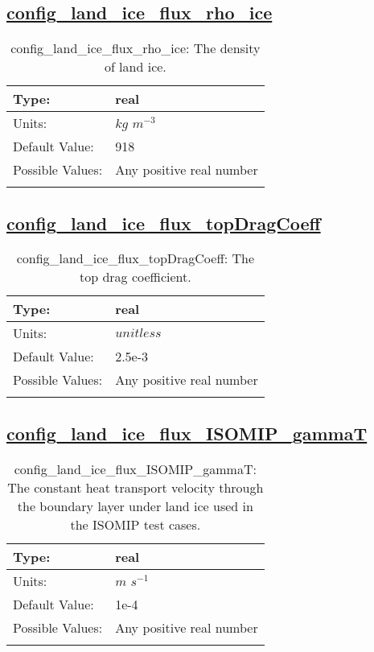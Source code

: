 \subsection[config\_land\_ice\_flux\_rho\_ice]{\hyperref[sec:nm_tab_land_ice_fluxes]{config\_land\_ice\_flux\_rho\_ice}}
\label{subsec:nm_sec_config_land_ice_flux_rho_ice}
\begin{center}
\begin{longtable}{| p{2.0in} || p{4.0in} |}
    \hline
    Type: & real \\
    \hline
    Units: & $kg$ $m^{-3}$ \\
    \hline
    Default Value: & 918 \\
    \hline
    Possible Values: & Any positive real number \\
    \hline
    \caption{config\_land\_ice\_flux\_rho\_ice: The density of land ice.}
\end{longtable}
\end{center}
\subsection[config\_land\_ice\_flux\_topDragCoeff]{\hyperref[sec:nm_tab_land_ice_fluxes]{config\_land\_ice\_flux\_topDragCoeff}}
\label{subsec:nm_sec_config_land_ice_flux_topDragCoeff}
\begin{center}
\begin{longtable}{| p{2.0in} || p{4.0in} |}
    \hline
    Type: & real \\
    \hline
    Units: & $unitless$ \\
    \hline
    Default Value: & 2.5e-3 \\
    \hline
    Possible Values: & Any positive real number \\
    \hline
    \caption{config\_land\_ice\_flux\_topDragCoeff: The top drag coefficient.}
\end{longtable}
\end{center}
\subsection[config\_land\_ice\_flux\_ISOMIP\_gammaT]{\hyperref[sec:nm_tab_land_ice_fluxes]{config\_land\_ice\_flux\_ISOMIP\_gammaT}}
\label{subsec:nm_sec_config_land_ice_flux_ISOMIP_gammaT}
\begin{center}
\begin{longtable}{| p{2.0in} || p{4.0in} |}
    \hline
    Type: & real \\
    \hline
    Units: & $m$ $s^{-1}$ \\
    \hline
    Default Value: & 1e-4 \\
    \hline
    Possible Values: & Any positive real number \\
    \hline
    \caption{config\_land\_ice\_flux\_ISOMIP\_gammaT: The constant heat transport velocity through the boundary layer under land ice used in the ISOMIP test cases.}
\end{longtable}
\end{center}
